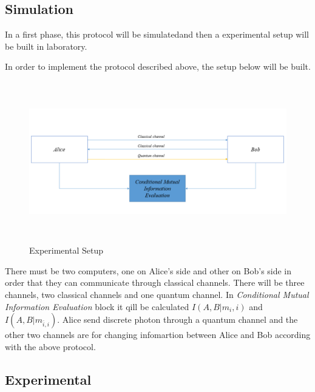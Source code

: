 \subsection{Simulation}

In a first phase, this protocol will be simulatedand then a experimental setup will be built in laboratory.

In order to implement the protocol described above, the setup below will be built.
\begin{figure}[H]
	\centering
	\includegraphics[width=1.0\textwidth, height=7cm]{./sdf/ot_with_discrete_variables/figures/SetupOt.png}
	\caption{Experimental Setup}\label{experimentalsetup}
\end{figure}

There must be two computers, one on Alice's side and other on Bob's side in order that they can communicate through classical channels. There will be three channels, two classical channels and one quantum channel. In \textit{Conditional Mutual Information Evaluation} block it qill be calculated $I(A,B|m_{i},i)$ and $I(A,B|m_{\bar{i}, i})$.
Alice send discrete photon through a quantum channel and the other two channels are for changing infomartion between Alice and Bob according with the above protocol.

\subsection{Experimental}
